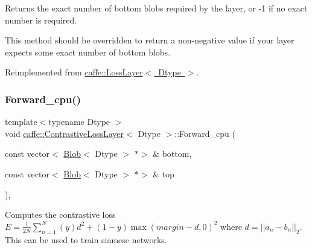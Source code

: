 Returns the exact number of bottom blobs required by the layer, or -\/1 if no exact number is required. 

This method should be overridden to return a non-\/negative value if your layer expects some exact number of bottom blobs. 

Reimplemented from \mbox{\hyperlink{classcaffe_1_1_loss_layer_af1620064baefb711e2c767bdc92b6fb1}{caffe\+::\+Loss\+Layer$<$ Dtype $>$}}.

\mbox{\label{classcaffe_1_1_contrastive_loss_layer_ae55966330621c1a2bd5a0012f2b09fe4}} 
\subsubsection{\texorpdfstring{Forward\+\_\+cpu()}{Forward\_cpu()}\hspace{0.1cm}{\footnotesize\ttfamily [1/2]}}
{\footnotesize\ttfamily template$<$typename Dtype $>$ \\
void \mbox{\hyperlink{classcaffe_1_1_contrastive_loss_layer}{caffe\+::\+Contrastive\+Loss\+Layer}}$<$ Dtype $>$\+::Forward\+\_\+cpu (\begin{DoxyParamCaption}\item[{const vector$<$ \mbox{\hyperlink{classcaffe_1_1_blob}{Blob}}$<$ Dtype $>$ $\ast$$>$ \&}]{bottom,  }\item[{const vector$<$ \mbox{\hyperlink{classcaffe_1_1_blob}{Blob}}$<$ Dtype $>$ $\ast$$>$ \&}]{top }\end{DoxyParamCaption})\hspace{0.3cm}{\ttfamily [protected]}, {\ttfamily [virtual]}}



Computes the contrastive loss $ E = \frac{1}{2N} \sum\limits_{n=1}^N \left(y\right) d^2 + \left(1-y\right) \max \left(margin-d, 0\right)^2 $ where $ d = \left| \left| a_n - b_n \right| \right|_2 $. This can be used to train siamese networks. 



